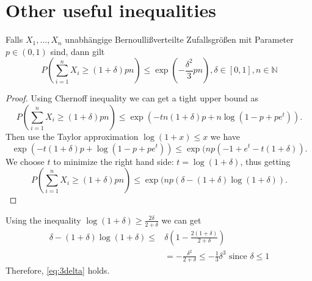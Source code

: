 \documentclass{article}
\theoremstyle{definition}
\begin{document}
\section{Other useful inequalities}
Falls $X_1, \dots, X_n$ unabhängige Bernoullißverteilte Zufallsgrößen mit
Parameter $p \in (0,1) $ sind, dann gilt
\begin{equation}\label{eq:3delta}
P(\sum_{i=1}^n X_i \geq (1+ \delta) pn ) \leq \exp(-\frac{\delta^2}{3} pn),
\delta \in [0,1], n \in \mathbb{N}
\end{equation}
\begin{proof}
Using Chernoff inequality we can get a tight upper bound
as
$$
P(\sum_{i=1}^n X_i \geq (1+ \delta) pn )  \leq \exp(-tn(1+\delta) p + n\log(1-p+pe^t)).
$$
Then use the Taylor approximation $\log(1+x) \leq x$ we have
$$
 \exp(-t(1+\delta) p + \log(1-p+pe^t)) \leq \exp(np(-1+e^t - t(1+\delta)).
$$
We choose $t$ to minimize the right hand side: $t=\log(1+\delta)$, thus getting
$$
P(\sum_{i=1}^n X_i \geq (1+ \delta) pn )  \leq \exp(np (\delta - (1+\delta)\log(1+\delta)).
$$
\end{proof}
Using the inequality $\log(1+\delta) \geq \frac{2\delta}{2+\delta} $ we
can get
\begin{align*}
\delta - (1+\delta)\log(1+\delta) \leq & \delta (1-\frac{2(1+\delta)}{2+\delta}) \\
& = -\frac{\delta^2}{2+\delta} \leq -\frac{1}{3} \delta^3 \textrm{ since } \delta \leq 1
\end{align*}
Therefore, \eqref{eq:3delta} holds.
\end{document}
